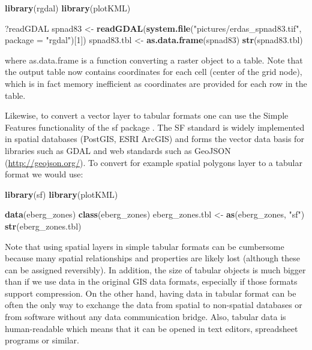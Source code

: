 \documentclass[10pt,b5paper,]{book}
\newenvironment{Shaded}{\begin{snugshade}}{\end{snugshade}}
\newcommand{\DataTypeTok}[1]{\textcolor[rgb]{0.13,0.29,0.53}{#1}}
\newcommand{\DecValTok}[1]{\textcolor[rgb]{0.00,0.00,0.81}{#1}}
\newcommand{\KeywordTok}[1]{\textcolor[rgb]{0.13,0.29,0.53}{\textbf{#1}}}
\newcommand{\NormalTok}[1]{#1}
\newcommand{\StringTok}[1]{\textcolor[rgb]{0.31,0.60,0.02}{#1}}
\theoremstyle{definition}
\theoremstyle{definition}
\theoremstyle{definition}
\theoremstyle{remark}
\begin{document}
\begin{Shaded}
\begin{Highlighting}[]
\KeywordTok{library}\NormalTok{(rgdal)}
\KeywordTok{library}\NormalTok{(plotKML)}

\NormalTok{?readGDAL}
\NormalTok{spnad83 <-}\StringTok{ }\KeywordTok{readGDAL}\NormalTok{(}\KeywordTok{system.file}\NormalTok{(}\StringTok{"pictures/erdas_spnad83.tif"}\NormalTok{, }
                                \DataTypeTok{package =} \StringTok{"rgdal"}\NormalTok{)[}\DecValTok{1}\NormalTok{])}
\NormalTok{spnad83.tbl <-}\StringTok{ }\KeywordTok{as.data.frame}\NormalTok{(spnad83)}
\KeywordTok{str}\NormalTok{(spnad83.tbl)}
\end{Highlighting}
\end{Shaded}

where as.data.frame is a function converting a raster object to a table.
Note that the output table now contains coordinates for each cell
(center of the grid node), which is in fact memory inefficient as
coordinates are provided for each row in the table.

Likewise, to convert a vector layer to tabular formats one can use the
Simple Features functionality of the sf package . The SF standard is
widely implemented in spatial databases (PostGIS, ESRI ArcGIS) and forms
the vector data basis for libraries such as GDAL and web standards such
as GeoJSON (\url{http://geojson.org/}). To convert for example spatial
polygons layer to a tabular format we would use:

\begin{Shaded}
\begin{Highlighting}[]
\KeywordTok{library}\NormalTok{(sf)}
\KeywordTok{library}\NormalTok{(plotKML)}

\KeywordTok{data}\NormalTok{(eberg_zones)}
\KeywordTok{class}\NormalTok{(eberg_zones)}
\NormalTok{eberg_zones.tbl <-}\StringTok{ }\KeywordTok{as}\NormalTok{(eberg_zones, }\StringTok{"sf"}\NormalTok{)}
\KeywordTok{str}\NormalTok{(eberg_zones.tbl)}
\end{Highlighting}
\end{Shaded}

Note that using spatial layers in simple tabular formats can be
cumbersome because many spatial relationships and properties are likely
lost (although these can be assigned reversibly). In addition, the size
of tabular objects is much bigger than if we use data in the original
GIS data formats, especially if those formats support compression. On
the other hand, having data in tabular format can be often the only way
to exchange the data from spatial to non-spatial databases or from
software without any data communication bridge. Also, tabular data is
human-readable which means that it can be opened in text editors,
spreadsheet programs or similar.
\end{document}
